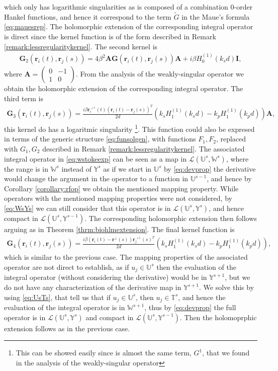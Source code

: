 \documentclass{article}
\newcommand{\IU}{{\mathbb U}}
\newcommand{\IT}{{\mathbb T}}
\newcommand{\IW}{{\mathbb W}}
\newcommand{\IY}{{\mathbb Y}}
\newcommand{\br}{\bm{r}}
\begin{document}
which only has  logarithmic singularities as is composed of a combination 0-order Hankel functions, and hence it correspond to the term $\widetilde{G}$ in the Maue's formula \eqref{eq:mauesrep}. The holomorphic extension of the corresponding integral operator is direct since the kernel function is of the form described in Remark \ref{remark:lessregularitykernel}. The second kernel is 
\begin{align*}
\mathbf{G}_2(\br_i(t),\br_j(s))=
4\beta^2 \mathbf{A}\mathbf{G}(\br_i(t),\br_j(s)) \mathbf{A} + i \beta H_0^{(1)}(k_s d)\mathbf{I},
\end{align*}
where $\mathbf{A} = \begin{pmatrix}
0&-1\\1&0
\end{pmatrix}$. From the analysis of the weakly-singular operator we obtain the holomorphic extension of the corresponding integral operator. The third term is
\begin{align*}
\mathbf{G}_3(\br_i(t),\br_j(s))=\frac{i \beta \br_i'^\perp(t)(\br_i(t)-\br_j(s))^T}{2d}  \left(
k_s H^{(1)}_1(k_s d)  -
 k_p H^{(1)}_1(k_p d) 
\right)\mathbf{A},
\end{align*}
this kernel do has a logaritmic singularity \footnote{This can be showed easily since is almost the same term, $G^1$, that we found in the analysis of the weakly-singular operator}. This function could also be expresed in terms of the generic structure \eqref{eq:funsolgen}, with functions $F_1,F_2$, replaced with $G_1,G_2$ described in Remark \ref{remark:lessregularitykernel}. The associated integral operator in \eqref{eq:wstokeexp} can be seen as a map in $\mathcal{L}\left( \IU^s,\IW^s \right)$, where the range is in $\IW^s$ instead of $\IY^s$ as if we start in $\IU^s$ by \eqref{eq:devprop} the derivative would change the argument in the operator to a function in $\IU^{s-1}$, and hence by Corollary \ref{corollary:rfop} we obtain the mentioned mapping property. While operators with the mentioned mapping properties were not considered, by \eqref{eq:WsYs} we can still consider that this operator is in $\mathcal{L}\left(\IU^s,\IY^s \right)$, and hence compact in  $\mathcal{L}\left(\IU^s,\IY^{s-1} \right)$. The corresponding holomorphic extension then follows  arguing as in Theorem \ref{thrm:biohlmextension}. The final kernel function is   
\begin{align*}
\mathbf{G}_4(\br_i(t),\br_j(s)) = \frac{i\beta (\br_i(t)-\br^\perp(s))\br_j'^\perp(s)^T}{2d}
\left(
k_s H^{(1)}_1(k_s d)  -
k_p H^{(1)}_1(k_p d)
\right),
\end{align*}
which is similar to the previous case. The mapping properties of the associated operator are not direct to establish, as if $u_j \in \IU^s$ then the evaluation of the integral operator (without considering the derivative) would be in $\IY^{s+1}$, but we do not have any characterization of the derivative map in $\IY^{s+1}$. We solve this by using \eqref{eq:UsTs}, that tell us that if $u_j \in \IU^s$, then $u_j \in \IT^s$, and hence the evaluation of the integral operator is in $\IW^{s+1}$, thus by \eqref{eq:devprop} the full operator is in $\mathcal{L}\left(\IU^s,\IY^s\right)$ and compact in $\mathcal{L}\left(\IU^s,\IY^{s-1}\right)$. Then the holomoprphic extension follows as in the previous case. 
\end{document}
